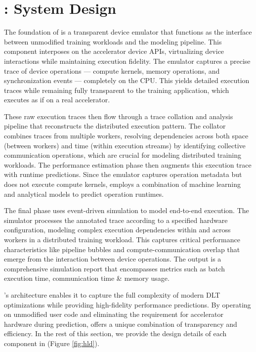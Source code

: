 



\vspace{-0.5em}

\section{\sysname : System Design}\label{sec:design}



The foundation of \sysname is a transparent device emulator that functions as the interface between unmodified training workloads and the modeling pipeline. This component interposes on the accelerator device APIs, virtualizing device interactions while maintaining execution fidelity. The emulator captures a precise trace of device operations --- compute kernels, memory operations, and synchronization events --- completely on the CPU. This yields detailed execution traces while remaining fully transparent to the training application, which executes as if on a real accelerator.

These raw execution traces then flow through a trace collation and analysis pipeline that reconstructs the distributed execution pattern. The collator combines traces from multiple workers, resolving dependencies across both space (between workers) and time (within execution streams) by identifying collective communication operations, which are crucial for modeling distributed training workloads. The performance estimation phase then augments this execution trace with runtime predictions. Since the emulator captures operation metadata but does not execute compute kernels, \sysname employs a combination of machine learning and analytical models to predict operation runtimes.

The final phase uses event-driven simulation to model end-to-end execution. The simulator processes the annotated trace according to a specified hardware configuration, modeling complex execution dependencies within and across workers in a distributed training workload. This captures critical performance characteristics like pipeline bubbles and compute-communication overlap that emerge from the interaction between device operations. The output is a comprehensive simulation report that encompasses metrics such as batch execution time, communication time \& memory usage.

\sysname's architecture enables it to capture the full complexity of modern DLT optimizations while providing high-fidelity performance predictions. By operating on unmodified user code and eliminating the requirement for accelerator hardware during prediction, \sysname offers a unique combination of transparency and efficiency. In the rest of this section, we provide the design details of each component in \sysname (Figure \ref{fig:hld}).

